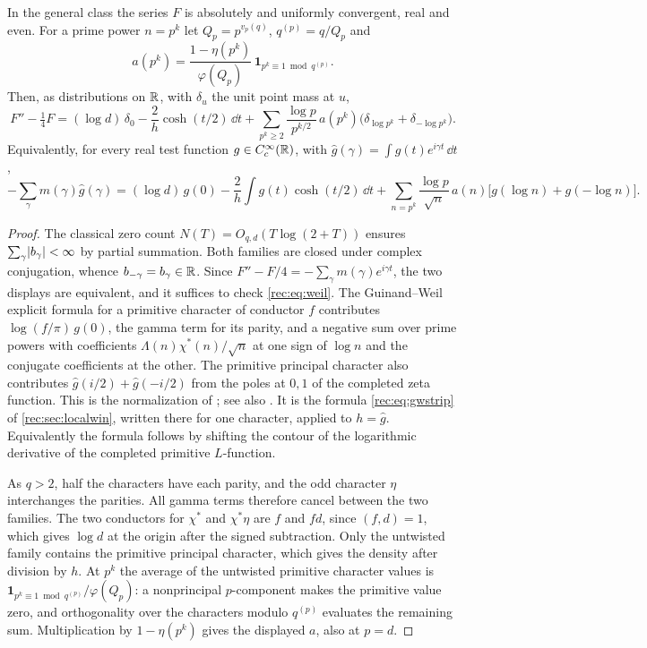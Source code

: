 \begin{proposition}\label{rec:prop:ode}
In the general class the series $F$ is absolutely and uniformly convergent, real and even.
For a prime power $n=p^k$ let $Q_p=p^{v_p(q)}$, $q^{(p)}=q/Q_p$ and
\[
 a(p^k)=\frac{1-\eta(p^k)}{\varphi(Q_p)}\,\mathbf 1_{p^k\equiv1\bmod q^{(p)}} .
\]
Then, as distributions on $\mathbb{R}$, with $\delta_u$ the unit point mass at $u$,
\begin{equation}\label{rec:eq:ode}
 F''-\tfrac14F=(\log d)\,\delta_0-\frac2h\cosh(t/2)\,\dd t
 +\sum_{p^k\ge2}\frac{\log p}{p^{k/2}}\,a(p^k)\bigl(\delta_{\log p^k}+\delta_{-\log p^k}\bigr).
\end{equation}
Equivalently, for every real test function $g\in C_c^\infty(\mathbb{R})$, with
$\widehat g(\gamma)=\int g(t)e^{i\gamma t}\,\dd t$,
\begin{equation}\label{rec:eq:weil}
 -\sum_\gamma m(\gamma)\widehat g(\gamma)
 =(\log d)\,g(0)-\frac2h\int g(t)\cosh(t/2)\,\dd t
 +\sum_{n=p^k}\frac{\log p}{\sqrt n}\,a(n)\bigl[g(\log n)+g(-\log n)\bigr].
\end{equation}
\end{proposition}
\begin{proof}
The classical zero count $N(T)=O_{q,d}(T\log(2+T))$ ensures $\sum_\gamma\lvert b_\gamma\rvert<\infty$
by partial summation. Both families are closed under complex conjugation, whence
$b_{-\gamma}=b_\gamma\in\mathbb{R}$. Since $F''-F/4=-\sum_\gamma m(\gamma)e^{i\gamma t}$, the two
displays are equivalent, and it suffices to check \eqref{rec:eq:weil}. The Guinand--Weil
explicit formula for a primitive character of conductor $f$ contributes $\log(f/\pi)\,g(0)$,
the gamma term for its parity, and a negative sum over prime powers with coefficients
$\Lambda(n)\chi^*(n)/\sqrt n$ at one sign of $\log n$ and the conjugate coefficients at the
other. The primitive principal character also contributes
$\widehat g(i/2)+\widehat g(-i/2)$ from the poles at $0,1$ of the completed zeta function.
This is the normalization of \cite[\S2.1]{ChirrePereiraDeLaat2021Primes}; see also
\cite{Booker2015Lfunctions}. It is the formula \eqref{rec:eq:gwstrip} of \cref{rec:sec:localwin}, written
there for one character, applied to $h=\widehat g$. Equivalently the formula follows by shifting the contour of the
logarithmic derivative of the completed primitive $L$-function.

As $q>2$, half the characters have each parity, and the odd character $\eta$ interchanges
the parities. All gamma terms therefore cancel between the two families. The two conductors
for $\chi^*$ and $\chi^*\eta$ are $f$ and $fd$, since $(f,d)=1$, which gives $\log d$ at the
origin after the signed subtraction. Only the untwisted family contains the primitive
principal character, which gives the density after division by $h$. At $p^k$ the average of
the untwisted primitive character values is
$\mathbf 1_{p^k\equiv1\bmod q^{(p)}}/\varphi(Q_p)$: a nonprincipal $p$-component makes the
primitive value zero, and orthogonality over the characters modulo $q^{(p)}$ evaluates the
remaining sum. Multiplication by $1-\eta(p^k)$ gives the displayed $a$, also at $p=d$.
\end{proof}

